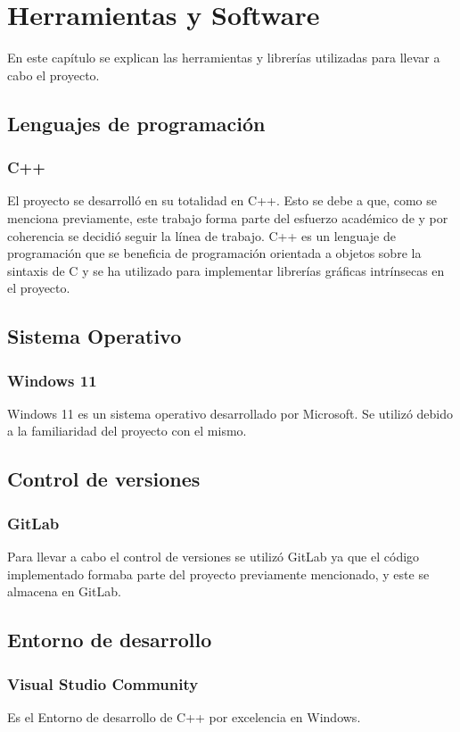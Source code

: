 \chapter{Herramientas y Software}
\label{chap:hs}
En este capítulo se explican las herramientas y librerías utilizadas para llevar a cabo el proyecto.
\section{Lenguajes de programación}
    \subsection{C++}    
El proyecto se desarrolló en su totalidad en C++. Esto se debe a que, como se menciona previamente, este trabajo forma parte del esfuerzo académico de \citeauthor{IglesiasGuitian2022} y por coherencia se decidió seguir la línea de trabajo.
C++ es un lenguaje de programación que se beneficia de programación orientada a objetos sobre la sintaxis de C y se ha utilizado para implementar librerías gráficas intrínsecas en el proyecto.

\section{Sistema Operativo}
\subsection{Windows 11}
Windows 11 es un sistema operativo desarrollado por Microsoft. Se utilizó debido a la familiaridad del proyecto con el mismo.
\section{Control de versiones}
    \subsection{GitLab}
Para llevar a cabo el control de versiones se utilizó GitLab ya que el código implementado formaba parte del proyecto previamente mencionado, y este se almacena en GitLab.
\section{Entorno de desarrollo}
    \subsection{Visual Studio Community}
Es el Entorno de desarrollo de C++ por excelencia en Windows.
